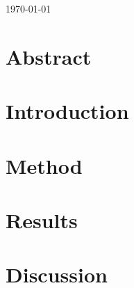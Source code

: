 \documentclass[a4paper]{article}
\begin{document}
\begin{center}
\vfill %

{\large \today}\\[2cm] 



\end{center}

\newpage

\section*{Abstract}


\newpage

\pagebreak
\tableofcontents
\pagebreak
{} 




\newpage
\section{Introduction}


\newpage
\section{Method} 


\newpage
\section{Results}


\newpage
\section{Discussion}




\newpage




\newpage
\appendix


% 
\end{document}
